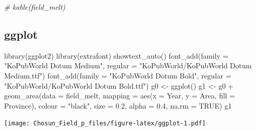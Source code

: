 \documentclass[
]{article}
\newenvironment{Shaded}{\begin{snugshade}}{\end{snugshade}}
\newcommand{\AttributeTok}[1]{\textcolor[rgb]{0.77,0.63,0.00}{#1}}
\newcommand{\CommentTok}[1]{\textcolor[rgb]{0.56,0.35,0.01}{\textit{#1}}}
\newcommand{\ConstantTok}[1]{\textcolor[rgb]{0.00,0.00,0.00}{#1}}
\newcommand{\FloatTok}[1]{\textcolor[rgb]{0.00,0.00,0.81}{#1}}
\newcommand{\FunctionTok}[1]{\textcolor[rgb]{0.00,0.00,0.00}{#1}}
\newcommand{\NormalTok}[1]{#1}
\newcommand{\OtherTok}[1]{\textcolor[rgb]{0.56,0.35,0.01}{#1}}
\newcommand{\SpecialCharTok}[1]{\textcolor[rgb]{0.00,0.00,0.00}{#1}}
\newcommand{\StringTok}[1]{\textcolor[rgb]{0.31,0.60,0.02}{#1}}
\begin{document}
\begin{Shaded}
\begin{Highlighting}[]
\CommentTok{\# kable(field\_melt)}
\end{Highlighting}
\end{Shaded}

\hypertarget{ggplot}{%
\subsection{ggplot}\label{ggplot}}

\begin{Shaded}
\begin{Highlighting}[]
\FunctionTok{library}\NormalTok{(ggplot2)}
\FunctionTok{library}\NormalTok{(extrafont)}
\FunctionTok{showtext\_auto}\NormalTok{()}
\FunctionTok{font\_add}\NormalTok{(}\AttributeTok{family =} \StringTok{"KoPubWorld Dotum Medium"}\NormalTok{, }\AttributeTok{regular =} \StringTok{"KoPubWorld/KoPubWorld Dotum Medium.ttf"}\NormalTok{)}
\FunctionTok{font\_add}\NormalTok{(}\AttributeTok{family =} \StringTok{"KoPubWorld Dotum Bold"}\NormalTok{, }\AttributeTok{regular =} \StringTok{"KoPubWorld/KoPubWorld Dotum Bold.ttf"}\NormalTok{)}
\NormalTok{g0 }\OtherTok{\textless{}{-}} \FunctionTok{ggplot}\NormalTok{()}
\NormalTok{g1 }\OtherTok{\textless{}{-}}\NormalTok{ g0 }\SpecialCharTok{+}
  \FunctionTok{geom\_area}\NormalTok{(}\AttributeTok{data =}\NormalTok{ field\_melt, }
            \AttributeTok{mapping =} \FunctionTok{aes}\NormalTok{(}\AttributeTok{x =}\NormalTok{ Year, }\AttributeTok{y =}\NormalTok{ Area, }\AttributeTok{fill =}\NormalTok{ Province),}
            \AttributeTok{colour =} \StringTok{"black"}\NormalTok{, }
            \AttributeTok{size =} \FloatTok{0.2}\NormalTok{, }
            \AttributeTok{alpha =} \FloatTok{0.4}\NormalTok{, }
            \AttributeTok{na.rm =} \ConstantTok{TRUE}\NormalTok{)}
\NormalTok{g1}
\end{Highlighting}
\end{Shaded}

\texttt{[image: Chosun\_Field\_p\_files/figure-latex/ggplot-1.pdf]}

\begin{Shaded}
\end{Shaded}
\end{document}
